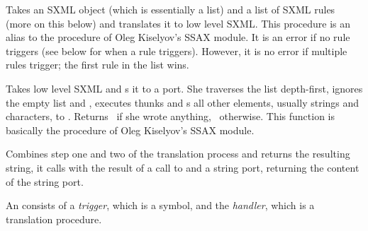 \begin{desc}
  Takes an SXML object (which is essentially a list) and a list of
  SXML rules (more on this below) and translates it to low level SXML.
  This procedure is an alias to the  procedure of
  Oleg Kiselyov's SSAX module.  It is an error if no rule triggers
  (see below for when a rule triggers).  However, it is no error if
  multiple rules trigger; the first rule in the  list wins.
\end{desc}

\begin{desc}
  Takes low level SXML and s it to a port.  She traverses
  the list  depth-first, ignores the empty list
  and \sharpf, executes thunks and s all other elements,
  usually strings and characters, to .  Returns \sharpt\ if
  she wrote anything, \sharpf\ otherwise.  This function is basically
  the  procedure of Oleg Kiselyov's SSAX module.
\end{desc}

\begin{desc}
  Combines step one and two of the translation process and returns the
  resulting string, \ie it calls  with the
  result of a call to  and a string port,
  returning the content of the string port.
\end{desc}


An  consists of a \textit{trigger}, which is a
symbol, and the \textit{handler}, which is a translation procedure.

